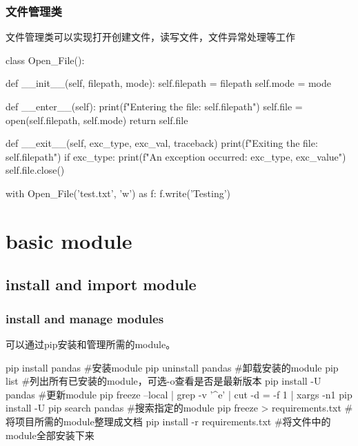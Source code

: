 \documentclass{article}
\begin{document}
      \subsubsection{文件管理类}
        文件管理类可以实现打开创建文件，读写文件，文件异常处理等工作
        \begin{codeblock}[language=python, caption={File management class}]
          class Open_File():

              def __init__(self, filepath, mode):
                  self.filepath = filepath
                  self.mode = mode

              def __enter__(self):
                  print(f"Entering the file: {self.filepath}")
                  self.file = open(self.filepath, self.mode)
                  return self.file

              def __exit__(self, exc_type, exc_val, traceback)
                  print(f"Exiting the file: {self.filepath}")
                  if exc_type:
                      print(f"An exception occurred: {exc_type}, {exc_value}")
                  self.file.close()

          with Open_File('test.txt', 'w') as f:
              f.write('Testing')
        \end{codeblock}

  \section{basic module}

    \subsection{install and import module}
      \subsubsection{install and manage modules}
        可以通过pip安装和管理所需的module。
        \begin{codeblock}[language=bash, caption={download modules}]
          pip install pandas  #安装module
          pip uninstall pandas  #卸载安装的module
          pip list #列出所有已安装的module，可选-o查看是否是最新版本
          pip install -U pandas #更新module
          pip freeze --local | grep -v '^\-e' | cut -d = -f 1 | xargs -n1 pip install -U
          pip search pandas #搜索指定的module
          pip freeze > requirements.txt #将项目所需的module整理成文档
          pip install -r requirements.txt #将文件中的module全部安装下来
        \end{codeblock}
\end{document}
